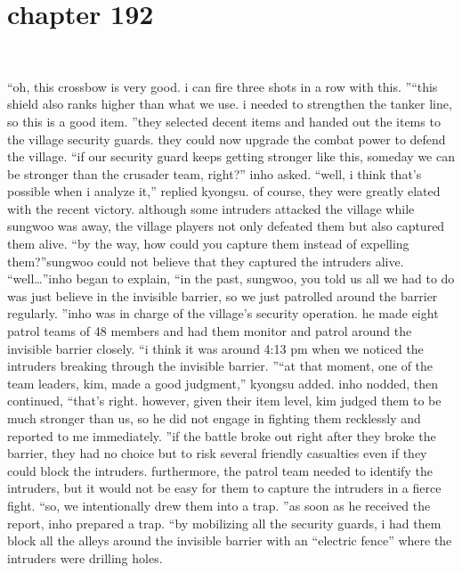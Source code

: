 \section{chapter 192}

                             




“oh, this crossbow is very good.
 i can fire three shots in a row with this.
”“this shield also ranks higher than what we use.
 i needed to strengthen the tanker line, so this is a good item.
”they selected decent items and handed out the items to the village security guards.
 they could now upgrade the combat power to defend the village.
“if our security guard keeps getting stronger like this, someday we can be stronger than the crusader team, right?” inho asked.
“well, i think that’s possible when i analyze it,” replied kyongsu.
of course, they were greatly elated with the recent victory.
although some intruders attacked the village while sungwoo was away, the village players not only defeated them but also captured them alive.
“by the way, how could you capture them instead of expelling them?”sungwoo could not believe that they captured the intruders alive.
“well…”inho began to explain, “in the past, sungwoo, you told us all we had to do was just believe in the invisible barrier, so we just patrolled around the barrier regularly.
”inho was in charge of the village’s security operation.
 he made eight patrol teams of 48 members and had them monitor and patrol around the invisible barrier closely.
“i think it was around 4:13 pm when we noticed the intruders breaking through the invisible barrier.
”“at that moment, one of the team leaders, kim, made a good judgment,” kyongsu added.
inho nodded, then continued, “that’s right.
 however, given their item level, kim judged them to be much stronger than us, so he did not engage in fighting them recklessly and reported to me immediately.
”if the battle broke out right after they broke the barrier, they had no choice but to risk several friendly casualties even if they could block the intruders.
furthermore, the patrol team needed to identify the intruders, but it would not be easy for them to capture the intruders in a fierce fight.
“so, we intentionally drew them into a trap.
”as soon as he received the report, inho prepared a trap.
“by mobilizing all the security guards, i had them block all the alleys around the invisible barrier with an “electric fence” where the intruders were drilling holes.

